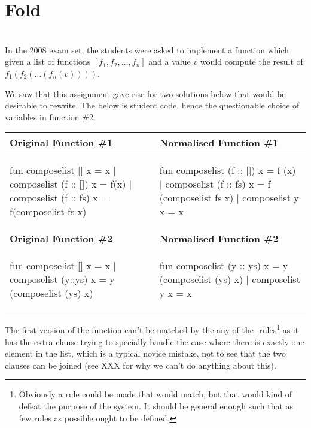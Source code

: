 \section{Fold}

\begin{example}[...]\
  \label{ex:fold-instance-composelist}\\
  In the 2008 exam set, the students were asked to implement a 
  function which given a list of functions $[f_1, f_2, \ldots, f_n]$ and a value
  $v$ would compute the result of $f_1(f_2(\ldots(f_n(v))))$.

  We saw that this assignment gave rise for two solutions below that would be
  desirable to rewrite. The below is student code, hence the questionable choice
  of variables in function \#2.

  \begin{center}
    \begin{tabular}{|l|l|}
      \hline
      \textbf{Original Function \#1}
      & 
      \textbf{Normalised Function \#1}
      \\\hline
\begin{sml}
fun composelist [] x = x 
  | composelist (f :: []) x = f(x) 
  | composelist (f :: fs) x = 
      f(composelist fs x)
\end{sml}
      &
\begin{sml}
fun composelist (f :: []) x = f (x)
  | composelist (f :: fs) x = 
      f (composelist fs x)
  | composelist y x = x        
\end{sml}
      \\\hline
      \textbf{Original Function \#2}
      &
      \textbf{Normalised Function \#2}
      \\\hline
\begin{sml}
fun composelist [] x = x 
  | composelist (y::ys) x = 
     y (composelist (ys) x)
\end{sml}
      &
\begin{sml}
fun composelist (y :: ys) x = 
      y (composelist (ys) x)
  | composelist y x = x
\end{sml}
      \\\hline
    \end{tabular}
  \end{center}

  \noindent
  The first version of the  function can't be matched by the
  any of the \tsf{fold}-rules\footnote{Obviously a rule could be made that would
    match, but that would kind of defeat the purpose of the system. It should be
    general enough such that as few rules as possible ought to be defined.} as
  it has the extra clause trying to specially handle the case where there is
  exactly one element in the list, which is a typical novice mistake, not to see
  that the two clauses can be joined (see XXX \fixme{ref to the unification} for
  why we can't do anything about this).


\end{example}
